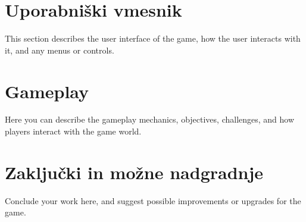 \documentclass[a4paper,12pt]{article}
\begin{document}
\newpage

\section{Uporabniški vmesnik}
\noindent This section describes the user interface of the game, how the user interacts with it, and any menus or controls.

\newpage

\section{Gameplay}
\noindent Here you can describe the gameplay mechanics, objectives, challenges, and how players interact with the game world.

\newpage

\section{Zaključki in možne nadgradnje}
\noindent Conclude your work here, and suggest possible improvements or upgrades for the game.
\end{document}
